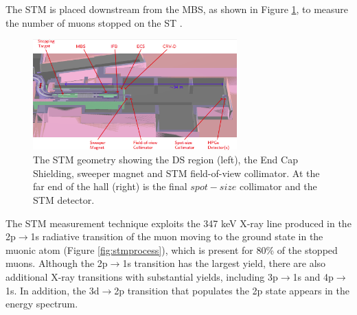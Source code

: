 The STM is placed downstream from the MBS, as shown in Figure \ref{fig:stm}, 
to measure the number of muons stopped on the ST .

\begin{figure}[!h]
    \centering
    \includegraphics[width =0.7\textwidth]{figures/png/Screenshot_20240306_180910.png}
    \caption[The Stopping Target Monitor geometry.]{The STM geometry showing the DS region (left), 
    the End Cap Shielding, sweeper magnet and STM field-of-view collimator. 
    At the far end of the hall (right) is the final $spot-size$ collimator and the STM detector.}
    \label{fig:stm}
    \end{figure}
    The STM measurement technique exploits the 347 keV X-ray line produced in the 2p$\rightarrow$1s 
    radiative transition of the muon moving to the ground state in the muonic atom (Figure \ref{fig:stmprocess}), 
    which is present for 80\% of the stopped muons. Although the 2p$\rightarrow$1s transition has the 
    largest yield, there are also additional X-ray transitions with substantial yields, 
    including 3p$\rightarrow$1s and 4p$\rightarrow$1s. In addition, the 3d$\rightarrow$2p 
    transition that populates the 2p state appears in the energy spectrum.

